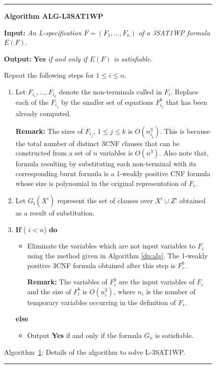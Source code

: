 \smallspacing
{\small
\begin{figure}[tbp]
\rule{\textwidth}{0.01in}

\noindent
{\bf Algorithm ALG-L3SAT1WP} 

\noindent
{\bf Input:} {\it An L-specification} $F = (F_1, \ldots , F_n)$
{\it of a 3SAT1WP formula } $E(F)$.  

\noindent
{\bf Output:} {\bf Yes} {\it if and only if $E(F)$ is satisfiable.} 

\noindent
Repeat the following steps for $1 \leq i \leq n$.

\begin{enumerate}
\item
Let $F_{i_1}, \ldots, F_{i_k}$ denote the non-terminals called in $F_i$.
Replace each of the $F_{i_j}$ by the smaller set of equations $F^b_{i_j}$
that has been already computed.

\noindent
{\bf Remark:} The sizes of $F_{i_j}$, $ 1 \leq j \leq k$ is $O(n_{i_j}^3)$.
This is because the total number of distinct {\sf 3CNF} clauses that can be
constructed from a set of $n$ variables is $O(n^3)$.
Also note that, formula resulting by substituting each non-terminal with 
its corresponding burnt formula is a 1-weakly positive {\sf CNF} formula 
whose size is polynomial in the original representation of $F_i$.

\item 
Let $G_i(X^i)$ represent the set of clauses  over $X^i \cup Z^i$
obtained as a result of substitution.

\item
{\bf If} ( $ i < n  $) {\bf do}
\begin{itemize}
\item
Eliminate the variables which are
not input variables to $F_i$ 
using the method given in Algorithm \ref{dp:alg}.
The 1-weakly positive {\sf 3CNF} formula obtained after this step is $F^b_i$.

\noindent
{\bf Remark:} The variables of $F^b_i$ are the input variables of $F_i$
and the size of $F^b_i$ is $O(n_i^3)$, where $n_i$ is the number of temporary
variables occurring in the definition of $F_i$.

\end{itemize}
{\bf else}
\begin{itemize}
\item
Output {\bf Yes} if and only if the formula $G_n$ is satisfiable.
\end{itemize}
\end{enumerate}


\label{l3sat1wp:alg}
\begin{center}
Algorithm~\ref{l3sat1wp:alg}: Details of the algorithm to solve 
{\sf L-3SAT1WP}.
\end{center}
\vspace*{-.2in}
\rule{\textwidth}{0.01in}
\end{figure}
}

